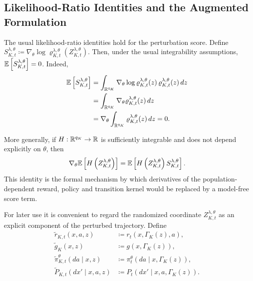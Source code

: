\subsection{Likelihood-Ratio Identities and the Augmented Formulation}
\label{appendix:gmm-augmented}

The usual likelihood-ratio identities hold for the perturbation score. Define $S_{K,t}^{\lambda,\theta} \coloneqq \nabla_\theta \log \varrho_{K,t}^{\lambda,\theta} \left( Z_{K,t}^{\lambda,\theta} \right)$. Then, under the usual integrability assumptions, $\mathbb{E} \left[ S_{K,t}^{\lambda,\theta} \right] = 0$. Indeed,
\begin{align}
    \mathbb{E} \left[ S_{K,t}^{\lambda,\theta} \right] &= \int_{\mathbb{R}^{q_K}} \nabla_\theta \log \varrho_{K,t}^{\lambda,\theta}(z) \, \varrho_{K,t}^{\lambda,\theta}(z) \,dz \\ &= \int_{\mathbb{R}^{q_K}} \nabla_\theta \varrho_{K,t}^{\lambda,\theta}(z) \,dz \\ &= \nabla_\theta \int_{\mathbb{R}^{q_K}} \varrho_{K,t}^{\lambda,\theta}(z) \,dz = 0.
\end{align}

More generally, if $H:\mathbb{R}^{q_K}\to\mathbb{R}$ is sufficiently integrable and does not depend explicitly on $\theta$, then
\begin{align}
    \nabla_\theta \mathbb{E} \left[ H \left( Z_{K,t}^{\lambda,\theta} \right) \right] = \mathbb{E} \left[ H \left( Z_{K,t}^{\lambda,\theta} \right) S_{K,t}^{\lambda,\theta} \right].
    \label{eq:gmm-likelihood-ratio-identity}
\end{align}
This identity is the formal mechanism by which derivatives of the population-dependent reward, policy and transition kernel would be replaced by a model-free score term.

For later use it is convenient to regard the randomized coordinate $Z_{K,t}^{\lambda,\theta}$ as an explicit component of the perturbed trajectory. Define
\begin{align}
    \widetilde r_{K,t}(x,a,z) &\coloneqq r_t \left( x, \Gamma_K(z), a \right), \\ \widetilde g_K(x,z) &\coloneqq g \left( x, \Gamma_K(z) \right), \\ \widetilde\pi_{K,t}^{\theta}(da\mid x,z) &\coloneqq \pi_t^\theta \left( da \mid x, \Gamma_K(z) \right), \\ \widetilde P_{K,t}(dx'\mid x,a,z) &\coloneqq P_t \left( dx' \mid x, a, \Gamma_K(z) \right).
    \label{eq:gmm-augmented-coefficients}
\end{align}


